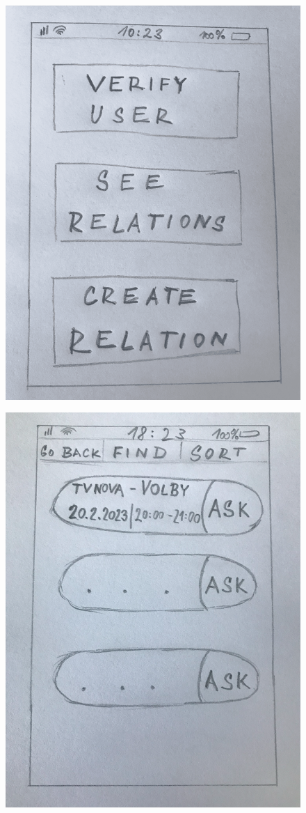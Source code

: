 \begin{figure}
\centering
\begin{minipage}{.5\textwidth}
  \centering
  \includegraphics[width=.9\linewidth]{obrazky/Navrh_uvod.png}
  \label{fig:navrh1}
\end{minipage}%
\begin{minipage}{.5\textwidth}
  \centering
  \includegraphics[width=.9\linewidth]{obrazky/Navrh_prehled.png}

\end{minipage}
\end{figure}
